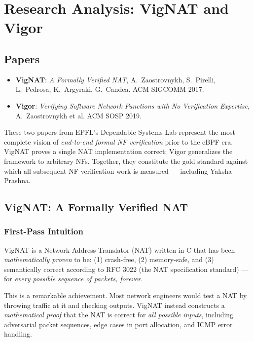 
\section{Research Analysis: VigNAT and Vigor}
\label{sec:vignat-vigor}

\subsection*{Papers}
\begin{itemize}
  \item \textbf{VigNAT}: \emph{A Formally Verified NAT}, A.\ Zaostrovnykh, S.\ Pirelli, L.\ Pedrosa, K.\ Argyraki, G.\ Candea. ACM SIGCOMM 2017.
  \item \textbf{Vigor}: \emph{Verifying Software Network Functions with No Verification Expertise}, A.\ Zaostrovnykh et al. ACM SOSP 2019.
\end{itemize}

These two papers from EPFL's Dependable Systems Lab represent the most complete vision of \emph{end-to-end formal NF verification} prior to the eBPF era. VigNAT proves a single NAT implementation correct; Vigor generalizes the framework to arbitrary NFs. Together, they constitute the gold standard against which all subsequent NF verification work is measured --- including Yaksha-Prashna.

\subsection{VigNAT: A Formally Verified NAT}

\subsubsection{First-Pass Intuition}

VigNAT is a Network Address Translator (NAT) written in C that has been \emph{mathematically proven} to be: (1) crash-free, (2) memory-safe, and (3) semantically correct according to RFC 3022 (the NAT specification standard) --- for \emph{every possible sequence of packets, forever}.

This is a remarkable achievement. Most network engineers would test a NAT by throwing traffic at it and checking outputs. VigNAT instead constructs a \emph{mathematical proof} that the NAT is correct for \emph{all possible inputs}, including adversarial packet sequences, edge cases in port allocation, and ICMP error handling.

